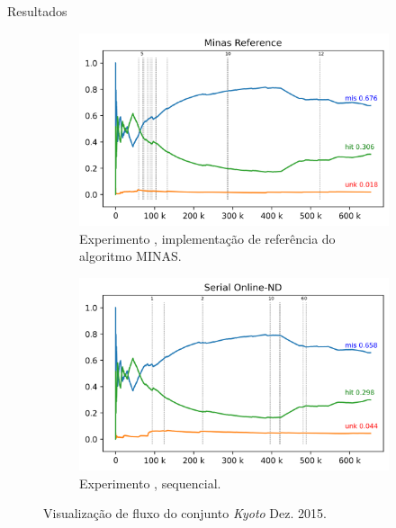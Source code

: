 \documentclass[aspectratio=1610,10pt]{beamer}
\newcommand{\minas}{MINAS\xspace}
\begin{document}
\begin{frame}[fragile]{Resultados}
  \begin{figure}
    \begin{subfigure}{0.49\textwidth}
      \centering
      \includegraphics[width=1\linewidth]{experiments/revised-java-log.png}
      \caption{Experimento \expA, implementação de referência do algoritmo \minas.}
      \label{fig:validation-java}
    \end{subfigure}
    \hfill
    \begin{subfigure}{0.49\textwidth}
      \centering
      \includegraphics[width=1\linewidth]{experiments/online-nd-log.png}
      \caption{Experimento \expB, \mfog sequencial.}
      \label{fig:validation-serial}
    \end{subfigure}
    \caption{Visualização de fluxo do conjunto \emph{Kyoto} Dez. 2015.}
  \end{figure}
\end{frame}
\end{document}
